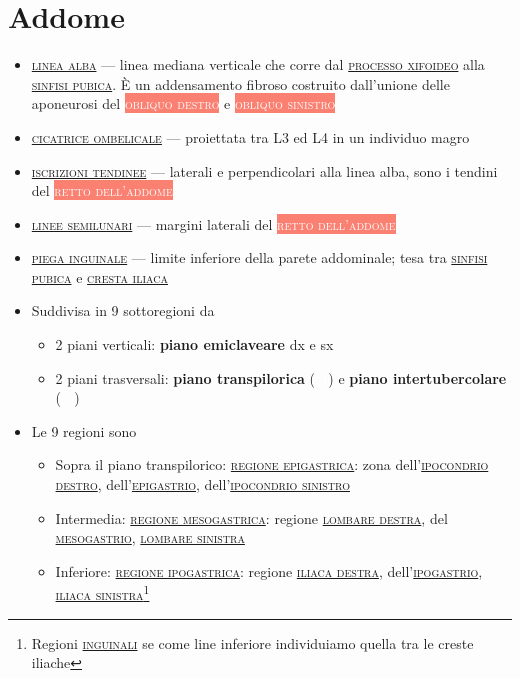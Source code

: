 \documentclass[italian,]{article}
\providecommand{\tightlist}{%
  \setlength{\itemsep}{0pt}\setlength{\parskip}{0pt}}
\newcommand{\marginnote}[1]{\marginpar{\footnotesize← \emph{#1}}}
\newcommand{\mus}[1]{\colorbox{Salmon}{\textcolor{white}{\textsc{#1}}}}
\newcommand{\oss}[1]{\colorbox{ossa}{\textcolor{white}{\textsc{#1}}}}
\renewcommand{\a}[1]{\underline{\textsc{#1}}}
\newcommand{\netter}[1]{ \fbox{\textsf{Netter (2014), tav. #1}} }
\newcommand{\normalbox}[2]{\begin{tcolorbox}[title=#1]#2\end{tcolorbox}} %
\begin{document}
\hypertarget{addome}{%
\section{Addome}\label{addome}}

\normalbox{Anatomia di superficie (landmark)}{
\begin{itemize}
\tightlist
\item \a{linea alba} --- linea mediana verticale che corre dal \a{processo xifoideo} alla \a{sinfisi pubica}. È un addensamento fibroso costruito dall'unione delle aponeurosi del \mus{obliquo destro} e \mus{obliquo sinistro}
\item \a{cicatrice ombelicale} --- proiettata tra L3 ed L4 in un individuo magro
\item \a{iscrizioni tendinee} --- laterali e perpendicolari alla linea alba, sono i tendini del \mus{retto dell'addome}
\item \a{linee semilunari} --- margini laterali del \mus{retto dell'addome}
\item \a{piega inguinale} --- limite inferiore della parete addominale; tesa tra \a{sinfisi pubica} e \a{cresta iliaca}
\end{itemize}

}

\begin{itemize}
\tightlist
\item
  Suddivisa in 9 sottoregioni da \marginnote{\netter{244}}

  \begin{itemize}
  \tightlist
  \item
    2 piani verticali: \textbf{piano emiclaveare} dx e sx
  \item
    2 piani trasversali: \textbf{piano transpilorica} (\oss{l1}) e
    \textbf{piano intertubercolare} (\oss{l5})
  \end{itemize}
\item
  Le 9 regioni sono

  \begin{itemize}
  \tightlist
  \item
    Sopra il piano transpilorico: \a{regione epigastrica}: zona
    dell'\a{ipocondrio destro}, dell'\a{epigastrio},
    dell'\a{ipocondrio sinistro}
  \item
    Intermedia: \a{regione mesogastrica}: regione \a{lombare destra},
    del \a{mesogastrio}, \a{lombare sinistra}
  \item
    Inferiore: \a{regione ipogastrica}: regione \a{iliaca destra},
    dell'\a{ipogastrio}, \a{iliaca sinistra}\footnote{Regioni
      \a{inguinali} se come line inferiore individuiamo quella tra le
      creste iliache}
  \end{itemize}
\end{itemize}
\end{document}
